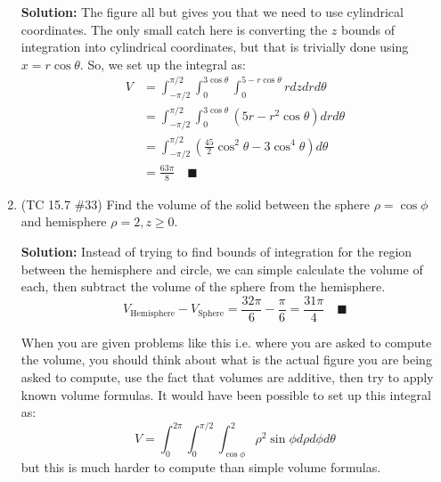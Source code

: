 \documentclass[letterpaper, 11pt]{article}
\begin{document}
\begin{enumerate}
\par \textbf{Solution:} The figure all but gives you that we need to use cylindrical coordinates. The only small catch here is converting the $z$ bounds of integration into cylindrical coordinates, but that is trivially done using $x = r \cos \theta$. So, we set up the integral as:
\begin{align*}
V &= \int_{-\pi/2}^{\pi/2} \int_0^{3 \cos \theta} \int_0^{5 - r \cos \theta} r dz dr d\theta \\
&=  \int_{-\pi/2}^{\pi/2} \int_0^{3 \cos \theta} (5r - r^2 \cos \theta) dr d\theta \\
&= \int_{-\pi/2}^{\pi/2} \left(\frac{45}{2} \cos^2 \theta - 3 \cos^4 \theta\right) d\theta \\
&= \frac{63 \pi}{8} \quad\blacksquare 
\end{align*}


\item (TC 15.7 \#33) Find the volume of the solid between the sphere $\rho = \cos \phi$ and hemisphere $\rho = 2, z \geq 0$. 

\par \textbf{Solution:} Instead of trying to find bounds of integration for the region between the hemisphere and circle, we can simple calculate the volume of each, then subtract the volume of the sphere from the hemisphere.
\[ V_{\text{Hemisphere}} - V_{\text{Sphere}} = \frac{32 \pi}{6} - \frac{\pi}{6} = \frac{31 \pi}{4} \quad\blacksquare \]

\par When you are given problems like this i.e. where you are asked to compute the volume, you should think about what is the actual figure you are being asked to compute, use the fact that volumes are additive, then try to apply known volume formulas. It would have been possible to set up this integral as:
\[ V = \int_0^{2\pi} \int_0^{\pi/2} \int_{\cos \phi}^2 \rho^2 \sin \phi d\rho d \phi d \theta \]
but this is much harder to compute than simple volume formulas. 

\end{enumerate}
\end{document}
